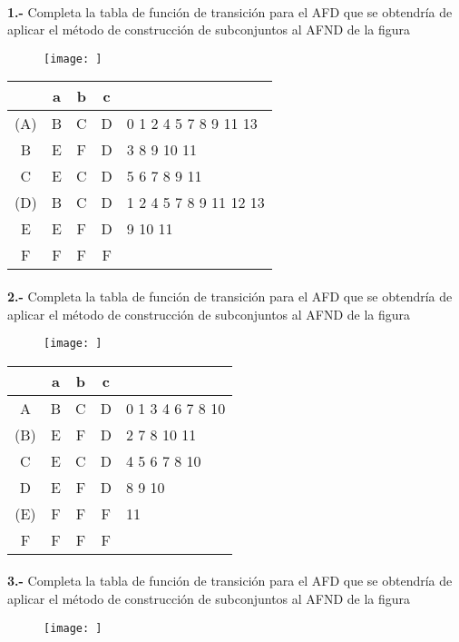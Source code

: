 \documentclass[11pt,a4paper]{report}
\begin{document}
\paragraph{}

\paragraph{}
\textbf{1.-} Completa la tabla de función de transición para el AFD que se obtendría de aplicar el método de construcción de subconjuntos al AFND de la figura
\begin{figure}[ht!]
\centering
\texttt{[image: ]}
\end{figure}

\begin{tabular} {| c | c |c |c | l |}
\hline 
& a & b & c & \\ \hline
(A) & B & C & D & 0 1 2 4 5 7 8 9 11 13 \\ \hline
B & E & F & D & 3 8 9 10 11 \\ \hline
C & E & C & D & 5 6 7 8 9 11 \\ \hline
(D) & B & C & D & 1 2 4 5 7 8 9 11 12 13 \\ \hline
E & E & F & D & 9 10 11 \\ \hline
F & F & F & F & \\ \hline
\end{tabular}\paragraph{}
\textbf{2.-} Completa la tabla de función de transición para el AFD que se obtendría de aplicar el método de construcción de subconjuntos al AFND de la figura
\begin{figure}[ht!]
\centering
\texttt{[image: ]}
\end{figure}

\begin{tabular} {| c | c |c |c | l |}
\hline 
& a & b & c & \\ \hline
A & B & C & D & 0 1 3 4 6 7 8 10 \\ \hline
(B) & E & F & D & 2 7 8 10 11 \\ \hline
C & E & C & D & 4 5 6 7 8 10 \\ \hline
D & E & F & D & 8 9 10 \\ \hline
(E) & F & F & F & 11 \\ \hline
F & F & F & F & \\ \hline
\end{tabular}\paragraph{}
\textbf{3.-} Completa la tabla de función de transición para el AFD que se obtendría de aplicar el método de construcción de subconjuntos al AFND de la figura
\begin{figure}[ht!]
\centering
\texttt{[image: ]}
\end{figure}
\end{document}
